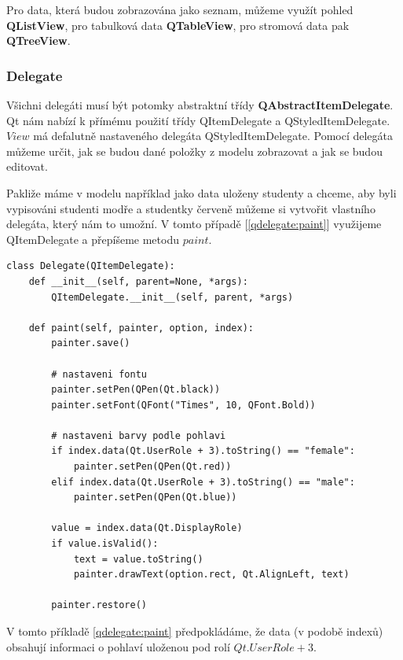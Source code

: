 Pro data, která budou zobrazována jako seznam, můžeme využít pohled \textbf{QListView}, pro tabulková data \textbf{QTableView}, pro stromová data pak \textbf{QTreeView}.

\subsubsection*{Delegate}
Všichni delegáti musí být potomky abstraktní třídy \textbf{QAbstractItemDelegate}. Qt nám nabízí k přímému použití třídy QItemDelegate a QStyledItemDelegate. $View$ má defalutně nastaveného delegáta QStyledItemDelegate. Pomocí delegáta můžeme určit, jak se budou dané položky z modelu zobrazovat a jak se budou editovat. 

Pakliže máme v modelu například jako data uloženy studenty a chceme, aby byli vypisováni studenti modře a studentky červeně můžeme si vytvořit vlastního delegáta, který nám to umožní. V tomto případě [\lstlistingname \ref{qdelegate:paint}] využijeme QItemDelegate a přepíšeme metodu $paint$. \\

\newpage
\begin{lstlisting}[label=qdelegate:paint,caption={Delegate - přepsání metody $paint$}, morekeywords={QItemDelegate, Qt, QFont, AlignLeft, DisplayRole, UserRole, QPen}]
class Delegate(QItemDelegate):
    def __init__(self, parent=None, *args):
        QItemDelegate.__init__(self, parent, *args)

    def paint(self, painter, option, index):
        painter.save()       
        
        # nastaveni fontu
        painter.setPen(QPen(Qt.black))
        painter.setFont(QFont("Times", 10, QFont.Bold))
        
		# nastaveni barvy podle pohlavi
        if index.data(Qt.UserRole + 3).toString() == "female":
            painter.setPen(QPen(Qt.red))
        elif index.data(Qt.UserRole + 3).toString() == "male":
            painter.setPen(QPen(Qt.blue))

        value = index.data(Qt.DisplayRole)
        if value.isValid():
            text = value.toString()
            painter.drawText(option.rect, Qt.AlignLeft, text)
            
        painter.restore()
\end{lstlisting}

        
\noindent V tomto příkladě \ref{qdelegate:paint} předpokládáme, že data (v podobě indexů) obsahují informaci o pohlaví uloženou pod rolí $Qt.UserRole + 3$.

